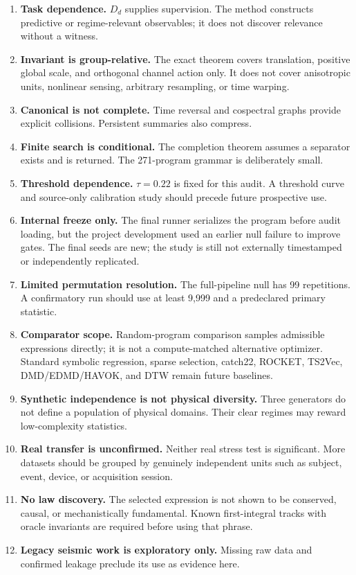 \documentclass[10pt]{article}
\theoremstyle{definition}
\theoremstyle{remark}
\begin{document}
\begin{enumerate}
\item \textbf{Task dependence.} $D_d$ supplies supervision. The method constructs predictive or regime-relevant observables; it does not discover relevance without a witness.
\item \textbf{Invariant is group-relative.} The exact theorem covers translation, positive global scale, and orthogonal channel action only. It does not cover anisotropic units, nonlinear sensing, arbitrary resampling, or time warping.
\item \textbf{Canonical is not complete.} Time reversal and cospectral graphs provide explicit collisions. Persistent summaries also compress.
\item \textbf{Finite search is conditional.} The completion theorem assumes a separator exists and is returned. The 271-program grammar is deliberately small.
\item \textbf{Threshold dependence.} $\tau=0.22$ is fixed for this audit. A threshold curve and source-only calibration study should precede future prospective use.
\item \textbf{Internal freeze only.} The final runner serializes the program before audit loading, but the project development used an earlier null failure to improve gates. The final seeds are new; the study is still not externally timestamped or independently replicated.
\item \textbf{Limited permutation resolution.} The full-pipeline null has 99 repetitions. A confirmatory run should use at least 9,999 and a predeclared primary statistic.
\item \textbf{Comparator scope.} Random-program comparison samples admissible expressions directly; it is not a compute-matched alternative optimizer. Standard symbolic regression, sparse selection, catch22, ROCKET, TS2Vec, DMD/EDMD/HAVOK, and DTW remain future baselines.
\item \textbf{Synthetic independence is not physical diversity.} Three generators do not define a population of physical domains. Their clear regimes may reward low-complexity statistics.
\item \textbf{Real transfer is unconfirmed.} Neither real stress test is significant. More datasets should be grouped by genuinely independent units such as subject, event, device, or acquisition session.
\item \textbf{No law discovery.} The selected expression is not shown to be conserved, causal, or mechanistically fundamental. Known first-integral tracks with oracle invariants are required before using that phrase.
\item \textbf{Legacy seismic work is exploratory only.} Missing raw data and confirmed leakage preclude its use as evidence here.
\end{enumerate}
\end{document}
